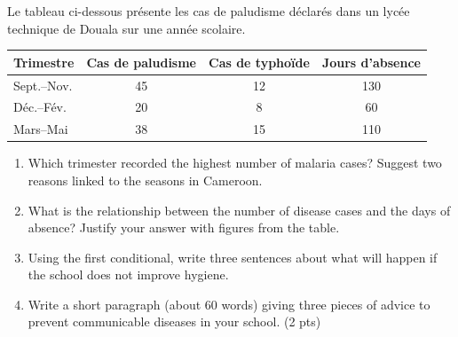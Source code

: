 \documentclass[11pt]{article}
\begin{document}
\begin{exercice}
Le tableau ci-dessous présente les cas de paludisme déclarés dans un lycée technique de Douala sur une année scolaire.

\begin{center}
\begin{tabular}{|l|c|c|c|}
\hline
\textbf{Trimestre} & \textbf{Cas de paludisme} & \textbf{Cas de typhoïde} & \textbf{Jours d'absence} \\
\hline
Sept.--Nov. & 45 & 12 & 130 \\
\hline
Déc.--Fév. & 20 & 8 & 60 \\
\hline
Mars--Mai & 38 & 15 & 110 \\
\hline
\end{tabular}
\end{center}

\begin{enumerate}
\item Which trimester recorded the highest number of malaria cases? Suggest two reasons linked to the seasons in Cameroon.
\item What is the relationship between the number of disease cases and the days of absence? Justify your answer with figures from the table.
\item Using the first conditional, write three sentences about what will happen if the school does not improve hygiene.
\item Write a short paragraph (about 60 words) giving three pieces of advice to prevent communicable diseases in your school. (2 pts)
\end{enumerate}
\end{exercice}
\end{document}
